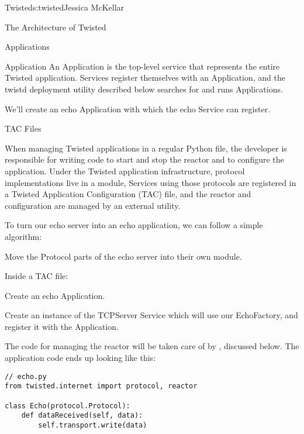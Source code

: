 \begin{aosachapter}{Twisted}{s:twisted}{Jessica McKellar}
\begin{aosasect1}{The Architecture of Twisted}
\begin{aosasect2}{Applications}
\begin{aosasect3}{Application}
An Application is the top-level service that represents the entire Twisted
application. Services register themselves with an Application, and the twistd
deployment utility described below searches for and runs Applications.

We'll create an echo Application with which the echo Service can
register.

\end{aosasect3}

\begin{aosasect3}{TAC Files}

When managing Twisted applications in a regular Python file, the developer is
responsible for writing code to start and stop the reactor and to configure the
application. Under the Twisted application infrastructure, protocol
implementations live in a module, Services using those protocols are registered
in a Twisted Application Configuration (TAC) file, and the reactor and
configuration are managed by an external utility.

To turn our echo server into an echo application, we can follow a simple
algorithm:

\begin{aosaenumerate}

\item Move the Protocol parts of the echo server into their own
  module.

\item Inside a TAC file:
    \begin{aosaenumerate}
    
\item Create an echo Application.

    
\item Create an instance of the TCPServer Service which will use our
  EchoFactory, and register it with the Application.
    
\end{aosaenumerate}

\end{aosaenumerate}

The code for managing the reactor will be taken care of by
, discussed below. The application code ends up looking like
this:

\begin{verbatim}
// echo.py
from twisted.internet import protocol, reactor

class Echo(protocol.Protocol):
    def dataReceived(self, data):
        self.transport.write(data)


\end{verbatim}
\end{aosasect3}
\end{aosasect2}
\end{aosasect1}
\end{aosachapter}
